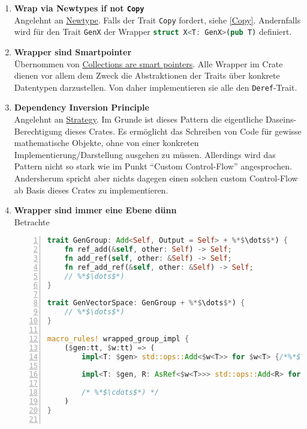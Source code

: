 \documentclass[12pt]{article}
\begin{document}
\begin{enumerate}[1)]
\item \textbf{Wrap via Newtypes if not \texttt{Copy}}\\
Angelehnt an \href{https://rust-unofficial.github.io/patterns/patterns/behavioural/newtype.html}{Newtype}. Falls der Trait \texttt{Copy} fordert, siehe \ref{Copy}. Andernfalls wird für den Trait \lstinline[language=Rust, morekeywords={GenX}]|GenX| der Wrapper \lstinline[language=Rust, morekeywords={GenX, X, T}]|struct X<T: GenX>(pub T)| definiert.
\item \textbf{Wrapper sind Smartpointer}\\
Übernommen von \href{https://rust-unofficial.github.io/patterns/idioms/deref.html}{Collections are smart pointers}. Alle Wrapper im Crate dienen vor allem dem Zweck die Abstraktionen der Traits über konkrete Datentypen darzustellen. Von daher implementieren sie alle den \texttt{Deref}-Trait.
\item \textbf{Dependency Inversion Principle}\\
Angelehnt an \href{https://rust-unofficial.github.io/patterns/patterns/behavioural/strategy.html}{Strategy}. Im Grunde ist dieses Pattern die eigentliche Daseins-Berechtigung dieses Crates. Es ermöglicht das Schreiben von Code für gewisse mathematische Objekte, ohne von einer konkreten Implementierung/Darstellung ausgehen zu müssen. Allerdings wird das Pattern nicht so stark wie im Punkt ``Custom Control-Flow'' angesprochen. Andersherum spricht aber nichts dagegen einen solchen custom Control-Flow ab Basis dieses Crates zu implementieren.
\item \textbf{Wrapper sind immer eine Ebene dünn}\\
Betrachte %
\begin{lstlisting}[language=Rust, numbers=left, emph={wrapped_group_impl!}, morekeywords={R, ops}]
trait GenGroup: Add<Self, Output = Self> + %*$\dots$*) {
	fn ref_add(&self, other: Self) -> Self;
	fn add_ref(self, other: &Self) -> Self;
	fn ref_add_ref(&self, other: &Self) -> Self;
	// %*$\dots$*)
}

trait GenVectorSpace: GenGroup + %*$\dots$*) {
	// %*$\dots$*)
}

macro_rules! wrapped_group_impl {
	($gen:tt, $w:tt) => (
		impl<T: $gen> std::ops::Add<$w<T>> for $w<T> {/*%*$\cdots$*)*/}

		impl<T: $gen, R: AsRef<$w<T>>> std::ops::Add<R> for $w<T> {/*%*$\cdots$*)*/}

		/* %*$\cdots$*) */
	)
}


\end{lstlisting}
\end{enumerate}
\end{document}
